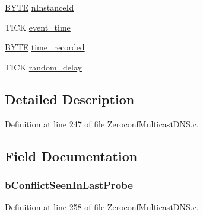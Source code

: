 \begin{DoxyCompactItemize}
\hyperlink{_generic_type_defs_8h_a4ae1dab0fb4b072a66584546209e7d58}{B\+Y\+T\+E} \hyperlink{struct__m_d_n_s_process_ctx__common_a1215d8072e91f88afc3d2fbbc5e469a6}{n\+Instance\+Id}
\item 
T\+I\+C\+K \hyperlink{struct__m_d_n_s_process_ctx__common_ae4a65a151cb60754fa5f6621d40380c5}{event\+\_\+time}
\item 
\hyperlink{_generic_type_defs_8h_a4ae1dab0fb4b072a66584546209e7d58}{B\+Y\+T\+E} \hyperlink{struct__m_d_n_s_process_ctx__common_ab8ae3ac957cf0b033b2504b499d27eb6}{time\+\_\+recorded}
\item 
T\+I\+C\+K \hyperlink{struct__m_d_n_s_process_ctx__common_a38971a737da50cfa4fb2625b51633cd2}{random\+\_\+delay}
\end{DoxyCompactItemize}


\subsection{Detailed Description}


Definition at line 247 of file Zeroconf\+Multicast\+D\+N\+S.\+c.



\subsection{Field Documentation}
\hypertarget{struct__m_d_n_s_process_ctx__common_a0de5f3a8d43b2008f85ed7bf2ad2cfb4}{}
\subsubsection[{b\+Conflict\+Seen\+In\+Last\+Probe}]{ b\+Conflict\+Seen\+In\+Last\+Probe}\label{struct__m_d_n_s_process_ctx__common_a0de5f3a8d43b2008f85ed7bf2ad2cfb4}


Definition at line 258 of file Zeroconf\+Multicast\+D\+N\+S.\+c.

\hypertarget{struct__m_d_n_s_process_ctx__common_ad084c67f660e33415a30016ed705ab09}{}
